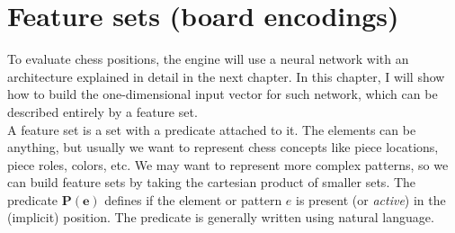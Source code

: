 
\newcommand{\pieceBoard}{
    \newcount\pieceindex
    \setcounter{pieceindex}{0}
    \raisebox{-7ex}{
        \centering
        \chessboard[
            tinyboard,
            showmover=false,
            margin=false,
            padding=false,
            hlabel=false,
            vlabel=false,
            pgfstyle={text},
            text=\fontsize{1.2ex}{1.2ex}\bfseries\sffamily \currentwq,
            markboard
        ]
    }
}
\newcommand{\pieceRolesTable}{
    \begin{tabular}{|l|}
        \hline
        \sympawn\ Pawn \\
        \hline
        \symknight\ Knight \\
        \hline
        \symbishop\ Bishop \\
        \hline
        \symrook\ Rook \\
        \hline
        \symqueen\ Queen \\
        \hline
        \symking\ King \\
        \hline
    \end{tabular}
}
\newcommand{\pieceColorsTable}{
    \begin{tabular}{|l|}
        \hline
        $\white$ White \\
        \hline
        $\black$ Black \\
        \hline
    \end{tabular}
}


\section{Feature sets (board encodings)}

To evaluate chess positions, the engine will use a neural network with an architecture explained in detail in the next chapter. In this chapter, I will show how to build the one-dimensional input vector for such network, which can be described entirely by a feature set. \\

A feature set is a set with a predicate attached to it. The elements can be anything, but usually we want to represent chess concepts like piece locations, piece roles, colors, etc. We may want to represent more complex patterns, so we can build feature sets by taking the cartesian product of smaller sets. The predicate $\bm{P(e)}$ defines if the element or pattern $e$ is present (or \textit{active}) in the (implicit) position. The predicate is generally written using natural language.

